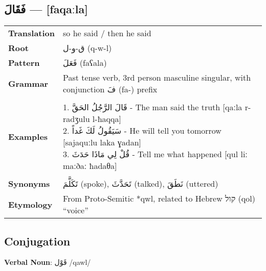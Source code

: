 \documentclass[letterpaper,12pt]{article}
\begin{document}
\subsection{\textarabic{فَقَالَ} — [faqaːla]}
\begin{tabular}{p{3cm}p{10cm}}
\toprule

\textbf{Translation} & so he said / then he said \\
\textbf{Root} & \textarabic{ق-و-ل} (q-w-l) \\
\textbf{Pattern} & \textarabic{فَعَلَ} (faʕala) \\
\textbf{Grammar} & Past tense verb, 3rd person masculine singular, with conjunction \textarabic{فَ} (fa-) prefix \\
\midrule \\
\textbf{Examples} & \makecell[l]{\parbox{9.5cm}{
1. \textarabic{قَالَ الرَّجُلُ الحَقَّ} - The man said the truth [qaːla r-radʒulu l-ħaqqa]\\
2. \textarabic{سَيَقُولُ لَكَ غَداً} - He will tell you tomorrow [sajaquːlu laka ɣadan]\\
3. \textarabic{قُلْ لِي مَاذَا حَدَثَ} - Tell me what happened [qul liː maːðaː ħadaθa]
} } \\
\midrule \\
\textbf{Synonyms} & \textarabic{تَكَلَّمَ} (spoke), \textarabic{تَحَدَّثَ} (talked), \textarabic{نَطَقَ} (uttered) \\
\textbf{Etymology} & From Proto-Semitic *qwl, related to Hebrew \texthebrew{קול} (qol) ``voice'' \\
\bottomrule
\end{tabular}

\subsection{Conjugation}
\par{ \large \textbf{Verbal Noun}: \textarabic{قَوْل} /qawl/}
\end{document}
